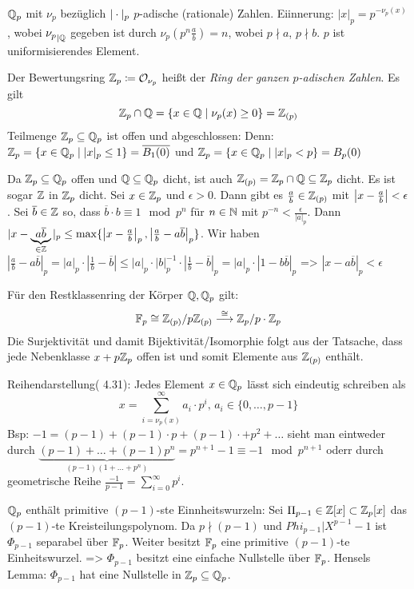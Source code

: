 \documentclass[../main.tex]{subfiles}
\begin{document}
\begin{remark}
    $\mathbb{Q}_p$ mit $\nu_p$ bezüglich $|\cdot|_p$ $p$-adische (rationale) Zahlen.
    Eiinnerung: $|x|_p = p^{-\nu_p(x)}$, wobei ${\nu_p}_{|\mathbb{Q}}$ gegeben ist durch $\nu_p(p^n\frac{a}{b}) = n$, wobei $p\nmid a$, $p\nmid b$.
    $p$ ist uniformisierendes Element.

    Der Bewertungsring $\mathbb{Z}_p\coloneqq \mathcal{O}_{\nu_p}$ heißt der \emph{Ring der ganzen $p$-adischen Zahlen}.
    Es gilt $$\mathbb{Z}_p\cap \mathbb{Q} = \{x\in\mathbb{Q}\mid \nu_p(x)\geq 0\} = \mathbb{Z}_{(p)}$$
    Teilmenge $\mathbb{Z}_p\subseteq\mathbb{Q}_p$ ist offen und abgeschlossen:
    Denn: 
    $\mathbb{Z}_p = \{x\in\mathbb{Q}_p\mid |x|_p \leq 1\} = \overline{B_1(0)}$ und
    $\mathbb{Z}_p = \{x\in\mathbb{Q}_p\mid |x|_p<p\} = B_p(0)$ %

    Da $\mathbb{Z}_p\subseteq \mathbb{Q}_p$ offen und $\mathbb{Q}\subseteq \mathbb{Q}_p$ dicht, ist auch $\mathbb{Z}_{(p)} = \mathbb{Z}_p\cap \mathbb{Q} \subseteq \mathbb{Z}_p$ dicht.
    Es ist sogar $\mathbb{Z}$ in $\mathbb{Z}_p$ dicht.
    Sei $x\in \mathbb{Z}_p$ und $\epsilon>0$. Dann gibt es $\frac{a}{b}\in \mathbb{Z}_{(p)}$ mit $\left\vert x-\frac{a}{b} \right\vert<\epsilon$.
    Sei $\overline{b}\in \mathbb{Z}$ so, dass $\overline{b}\cdot b \equiv 1\mod p^n$ für $n\in \mathbb{N}$ mit $p^{-n} < \frac{\epsilon}{|a|_p}$. Dann $|x-\underbrace{a\overline{b}}_{\in \mathbb{Z}}|_p \leq \max \{\left\vert x-\frac{a}{b} \right\vert_p, \left\vert \frac{a}{b}-a\overline{b} \right\vert_p\}$.
    Wir haben $|\frac{a}{b}-a\overline{b}|_p = |a|_p\cdot |\frac{1}{b}-\overline{b}| \leq |a|_p \cdot |b|_p^{-1} \cdot |\frac{1}{b}-\overline{b}|_p = |a|_p\cdot |1-b\overline{b}|_p$
    => $|x-a\overline{b}|_p < \epsilon$

    Für den Restklassenring der Körper $\mathbb{Q}, \mathbb{Q}_p$ gilt:
    $$\mathbb{F}_p\cong \mathbb{Z}_{(p)}/p\mathbb{Z}_{(p)}\overset{\cong}{\longrightarrow} \mathbb{Z}_p/p\cdot \mathbb{Z}_p$$
    Die Surjektivität und damit Bijektivität/Isomorphie folgt aus der Tatsache, dass jede Nebenklasse $x+p\mathbb{Z}_p$ offen ist und somit Elemente aus $\mathbb{Z}_{(p)}$ enthält.

    Reihendarstellung( 4.31):
    Jedes Element $x\in \mathbb{Q}_p$ lässt sich eindeutig schreiben als $$x=\sum_{i=\nu_p(x)}^\infty a_i\cdot p^i\text{, } a_i\in \{0,\dots,p-1\}$$
    Bsp: $-1 = (p-1) + (p-1) \cdot p + (p-1)\cdot +p^2+\dots$
    sieht man eintweder durch $\underbrace{(p-1)+\dots + (p-1) p^n}_{(p-1)(1+\dots+p^n)} = p^{n+1}-1\equiv -1\mod p^{n+1}$ oderr durch geometrische Reihe $\frac{-1}{p-1}=\sum_{i=0}^\infty p^i$.

    $\mathbb{Q}_p$ enthält primitive $(p-1)$-ste Einnheitswurzeln:
    Sei $\Pi_{p-1}\in \mathbb{Z}[x]\subset \mathbb{Z}_p[x]$ das $(p-1)$-te Kreisteilungspolynom.
    Da $p\nmid (p-1)$ und $Phi_{p-1}|X^{p-1}-1$ ist $\Phi_{p-1}$ separabel über $\mathbb{F}_p$.
    Weiter besitzt $\mathbb{F}_p$ eine primitive $(p-1)$-te Einheitswurzel.
    => $\Phi_{p-1}$ besitzt eine einfache Nullstelle über $\mathbb{F}_p$.
    Hensels Lemma: $\Phi_{p-1}$ hat eine Nullstelle in $\mathbb{Z}_p\subseteq \mathbb{Q}_p$.
\end{remark}
\end{document}
